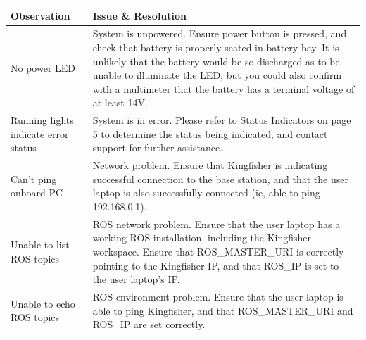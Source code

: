 \documentclass[]{clearpath-latex/clearpath-manual}
\begin{document}
\bgroup
\def\arraystretch{1.5}%
\begin{table}[h]
\centering
\label{troublshooting}
\begin{tabular}{p{} p{}}

\rowcolor{lightgrey} 
{\bf Observation}                    & {\bf Issue \& Resolution}                                                                                                                                                                                                                                                                                          \\ \hline
No power LED                         & System is unpowered. Ensure power button is pressed, and check that battery is properly seated in battery bay. It is unlikely that the battery would be so discharged as to be unable to illuminate the LED, but you could also confirm with a multimeter that the battery has a terminal voltage of at least 14V. \\ \hline
Running lights indicate error status & System is in error. Please refer to Status Indicators on page 5 to determine the status being indicated, and contact support for further assistance.                                                                                                                                                               \\ \hline
Can’t ping onboard PC                & Network problem. Ensure that Kingfisher is indicating successful connection to the base station, and that the user laptop is also successfully connected (ie, able to ping 192.168.0.1).                                                                                                                           \\ \hline
Unable to list ROS topics            & ROS network problem. Ensure that the user laptop has a working ROS installation, including the Kingfisher workspace. Ensure that ROS\_MASTER\_URI is correctly pointing to the Kingfisher IP, and that ROS\_IP is set to the user laptop’s IP.                                                                     \\ \hline
Unable to echo ROS topics            & ROS environment problem. Ensure that the user laptop is able to ping Kingfisher, and that ROS\_MASTER\_URI and ROS\_IP are set correctly.                                                                                                                                                                          \\ \hline
\end{tabular}
\end{table}
\egroup
\end{document}

